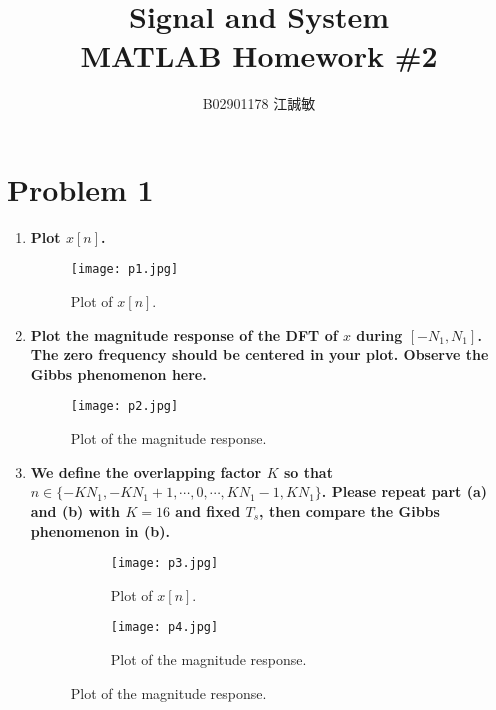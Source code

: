 \documentclass[12pt, a4paper]{article}
\title{ \bf {\Huge Signal and System}\\ MATLAB Homework \#2}
\author{B02901178 江誠敏}
\begin{document}
\maketitle

\section{Problem 1}
\begin{enumerate}[label=(\alph*)]
  \item {\bf Plot $x[n]$.} \\[12pt]

    \begin{figure}[H]
      \centering
      \texttt{[image: p1.jpg]}
      \caption{Plot of $x[n]$.}
    \end{figure}
  \item {\bf Plot the magnitude response of the DFT of $x$ during $[−N_1, N_1]$. The zero
    frequency should be centered in your plot. Observe the Gibbs phenomenon here.} \\[12pt]
    \begin{center}
    \begin{figure}[H]
      \centering
      \texttt{[image: p2.jpg]}
      \caption{Plot of the magnitude response.}
    \end{figure}
    \end{center}

  \item {\bf We define the overlapping factor $K$ so that $n \in \{−KN_1, −KN_1+1,\cdots , 0, \cdots , KN_1−1, KN_1\}$.
    Please repeat part (a) and (b) with $K = 16$ and fixed $T_s$, then compare the
  Gibbs phenomenon in (b).}\\[12pt]
    \begin{center}
    \begin{figure}[H]
      \begin{subfigure}{0.48\textwidth}
        \centering
        \texttt{[image: p3.jpg]}
        \caption{Plot of $x[n]$.}
      \end{subfigure}%
      \begin{subfigure}{0.48\textwidth}
        \centering
        \texttt{[image: p4.jpg]}
        \caption{Plot of the magnitude response.}
      \end{subfigure}
    \end{figure}
    \end{center}


\end{enumerate}
\end{document}
